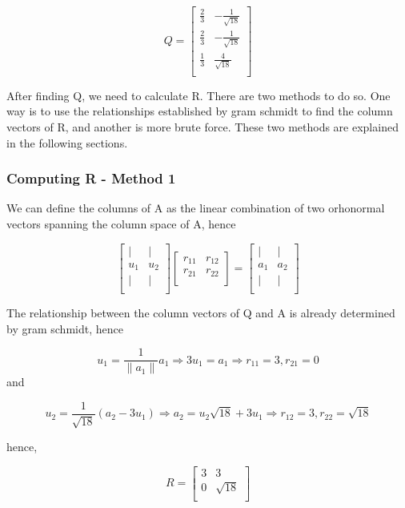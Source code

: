 \documentclass{article}
\begin{document}
$$
Q=\left
[\begin{array}{cc}
\frac{2}{3} & -\frac{1}{\sqrt{18}} \\
\frac{2}{3} & -\frac{1}{\sqrt{18}} \\
\frac{1}{3} & \frac{4}{\sqrt{18}} \\
\end{array}\right]
$$

After finding Q, we need to calculate R. There are two methods to do so. One way is to use the relationships established by gram schmidt to find the column vectors of R, and another is more brute force. These two methods are explained in the following sections.

\subsubsection{Computing R - Method 1}

We can define the columns of A as the linear combination of two orhonormal vectors spanning the column space of A, hence

$$
\left
[\begin{array}{cc}
| & | \\
u_{1} & u_{2} \\
| & | \\
\end{array}\right]\left [\begin{array}{cc}
r_{11} & r_{1 2}  \\
r_{2 1} &     r_{2 2} \\
\end{array}\right]=\left
[\begin{array}{cc}
| & | \\
a_{1} & a_{2} \\
| & | \\
\end{array}\right]
$$

The relationship between the column vectors of Q and A is already determined by gram schmidt, hence


$$
u_{1}= \frac{1}{\|a_{1}\|} a_{1}
\Rightarrow 3u_{1} =a_{1}
\Rightarrow
r_{1 1}=3, r_{2 1} = 0
$$
and

$$
u_{2}=\frac{1}{\sqrt{18}}(a_{2}-3u_{1})
\Rightarrow a_{2} = u_{2}\sqrt{18}+3u_{1}
\Rightarrow r_{1 2}=3, r_{2 2} = \sqrt{18}
$$

hence,

$$
R=\left [\begin{array}{cc}
3& 3  \\
0 & \sqrt{18} \\
\end{array}\right]
$$
\end{document}
